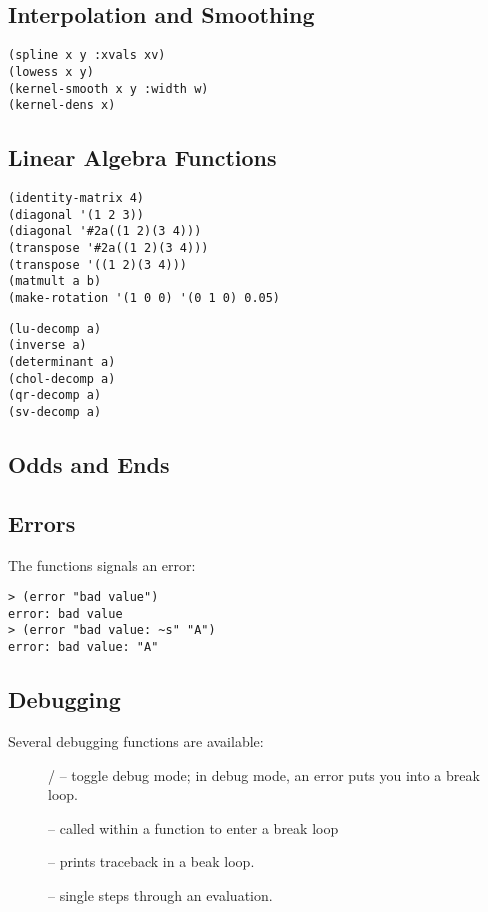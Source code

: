 \begin{slide}{}
\subsection{Interpolation and Smoothing}
\begin{verbatim}
(spline x y :xvals xv)
(lowess x y)
(kernel-smooth x y :width w)
(kernel-dens x)
\end{verbatim}

\subsection{Linear Algebra Functions}
\begin{verbatim}
(identity-matrix 4)
(diagonal '(1 2 3))
(diagonal '#2a((1 2)(3 4)))
(transpose '#2a((1 2)(3 4)))
(transpose '((1 2)(3 4)))
(matmult a b)
(make-rotation '(1 0 0) '(0 1 0) 0.05)
\end{verbatim}

\begin{verbatim}
(lu-decomp a)
(inverse a)
(determinant a)
(chol-decomp a)
(qr-decomp a)
(sv-decomp a)
\end{verbatim}
\end{slide}

\begin{slide}{}
\section{Odds and Ends}
\subsection{Errors}
The  functions signals an error:
{\Large
\begin{verbatim}
> (error "bad value")
error: bad value
> (error "bad value: ~s" "A")
error: bad value: "A"
\end{verbatim}}

\subsection{Debugging}
Several debugging functions are available:
\begin{description}
\item[]
/ -- toggle debug mode; in debug mode,
an error puts you into a break loop.
\item[]
 -- called within a function to enter a break loop
\item[]
 -- prints traceback in a beak loop.
\item[]
 -- single steps through an evaluation.
\end{description}
\end{slide}

